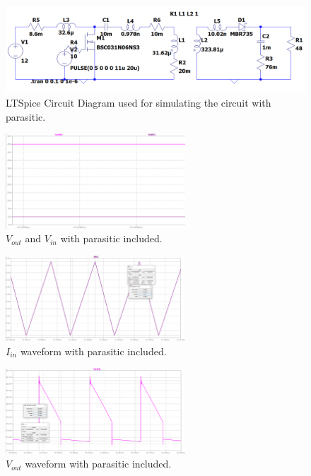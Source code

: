 \begin{figure}[H]
    \centering
    \includegraphics[width=\textwidth]{Figures/spice_circuit.png}
    \caption{LTSpice Circuit Diagram used for simulating the circuit with parasitic.}
    \label{fig:spice}
\end{figure}
\begin{figure}[H]
    \centering
    \includegraphics[width=0.6\textwidth]{Figures/vout-vin.png}
    \caption{$V_{out}$ and $V_{in}$ with parasitic included.}
    \label{fig:v_out_v_in}
\end{figure}
\begin{figure}[H]
    \centering
    \includegraphics[width=0.6\textwidth]{Figures/in-av-ripple.png}
    \caption{$I_{in}$ waveform with parasitic included.}
    \label{fig:i_in}
\end{figure}
\begin{figure}[H]
    \centering
    \includegraphics[width=0.6\textwidth]{Figures/vout-av-ripple.png}
    \caption{$V_{out}$ waveform with parasitic included.}
    \label{fig:v_out}
\end{figure}
